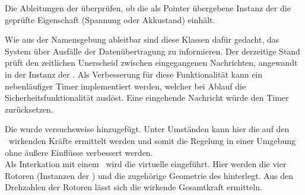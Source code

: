 Die Ableitungen der  überprüfen, ob die als Pointer übergebene Instanz der  die geprüfte Eigenschaft (Spannung oder Akkustand) einhält.


Wie aus der Namensgebung ableitbar sind diese Klassen dafür gedacht, das System über Ausfälle der Datenübertragung zu informieren.
Der derzeitige Stand prüft den zeitlichen Unerscheid zwischen eingegangenen Nachrichten, angewandt in der Instanz der .
Als Verbesserung für diese Funktionalität kann ein nebenläufiger Timer implementiert werden, welcher bei Ablauf die Sicherheitsfunktionalität auslöst. Eine eingehende Nachricht würde den Timer zurücksetzen.


Die  wurde versuchsweise hinzugefügt. Unter Umständen kann hier die auf den \Quad\ wirkenden Kräfte ermittelt werden und somit die Regelung in einer Umgebung ohne äußere Einflüsse verbessert werden.\\
Als Interkation mit einem \Quad\ wird die virtuelle  eingeführt. Hier werden die vier Rotoren (Instanzen der ) und die zugehörige Geometrie des \Quad[s] hinterlegt. Aus den Drehzahlen der Rotoren lässt sich die wirkende Gesamtkraft ermitteln.\\


